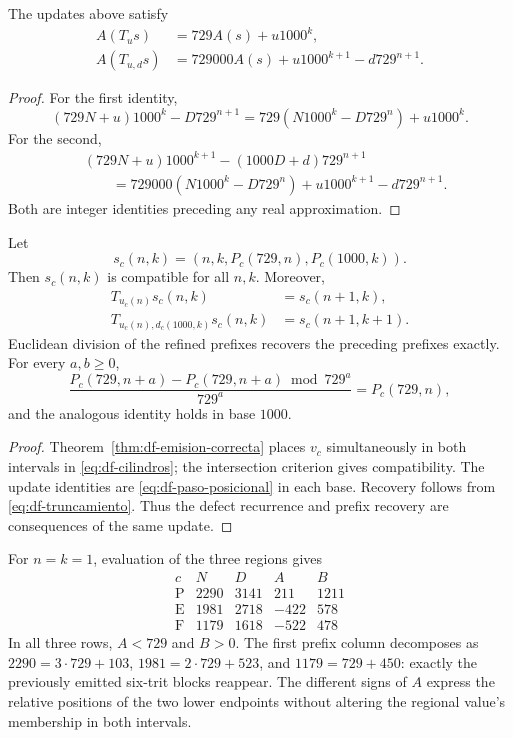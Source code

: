 \begin{proposition}
\label{prop:df-rec-frontera}
The updates above satisfy
\begin{align}
 A(T_u s)&=729A(s)+u1000^k,\label{eq:df-rec-ternaria}\\
 A(T_{u,d}s)&=729000A(s)+u1000^{k+1}-d729^{n+1}.
 \label{eq:df-rec-conjunta}
\end{align}
\end{proposition}

\begin{proof}
For the first identity,
\[
 (729N+u)1000^k-D729^{n+1}
 =729(N1000^k-D729^n)+u1000^k.
\]
For the second,
\begin{align*}
 &(729N+u)1000^{k+1}-(1000D+d)729^{n+1}\\
 &\qquad=729000(N1000^k-D729^n)
      +u1000^{k+1}-d729^{n+1}.
\end{align*}
Both are integer identities preceding any real approximation.
\end{proof}

\begin{theorem}
\label{thm:df-refinamiento-generado}
Let
\[
 s_c(n,k)=(n,k,P_c(729,n),P_c(1000,k)).
\]
Then \(s_c(n,k)\) is compatible for all \(n,k\). Moreover,
\begin{align*}
 T_{u_c(n)}s_c(n,k)&=s_c(n+1,k),\\
 T_{u_c(n),d_c(1000,k)}s_c(n,k)&=s_c(n+1,k+1).
\end{align*}
Euclidean division of the refined prefixes recovers the preceding
prefixes exactly. For every \(a,b\geq0\),
\[
 \frac{P_c(729,n+a)-P_c(729,n+a)\bmod729^a}{729^a}
 =P_c(729,n),
\]
and the analogous identity holds in base \(1000\).
\end{theorem}

\begin{proof}
Theorem~\ref{thm:df-emision-correcta} places \(v_c\) simultaneously in
both intervals in \eqref{eq:df-cilindros}; the intersection criterion
gives compatibility. The update identities are
\eqref{eq:df-paso-posicional} in each base. Recovery follows from
\eqref{eq:df-truncamiento}. Thus the defect recurrence and prefix
recovery are consequences of the same update.
\end{proof}

\begin{example}
For \(n=k=1\), evaluation of the three regions gives
\[
\begin{array}{c|rr|rr}
 c&N&D&A&B\\\hline
 \mathrm P&2290&3141&211&1211\\
 \mathrm E&1981&2718&-422&578\\
 \mathrm F&1179&1618&-522&478
\end{array}
\]
In all three rows, \(A<729\) and \(B>0\). The first prefix column
decomposes as \(2290=3\cdot729+103\),
\(1981=2\cdot729+523\), and \(1179=729+450\): exactly the previously
emitted six-trit blocks reappear. The different signs of \(A\) express
the relative positions of the two lower endpoints without altering the
regional value's membership in both intervals.
\end{example}

